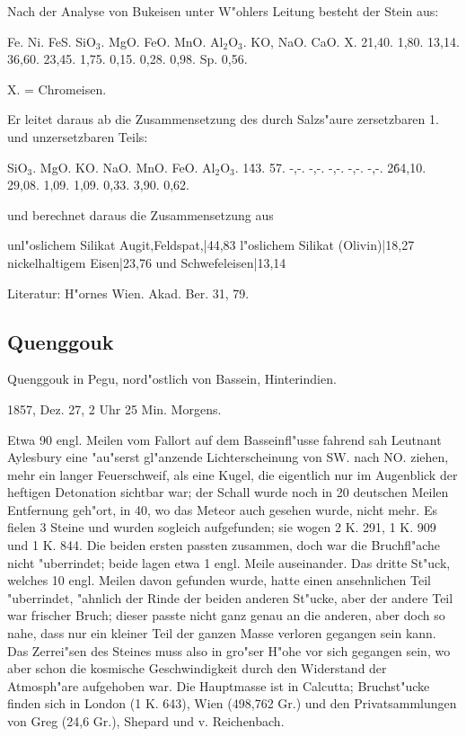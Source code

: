\documentclass[a4paper, 11pt, oneside]{article}
\begin{document}
Nach der Analyse von Bukeisen unter W"ohlers Leitung besteht der Stein aus:

Fe. Ni. FeS. SiO$_{3}$. MgO. FeO. MnO. Al$_{2}$O$_{3}$. KO, NaO. CaO. X.  
21,40. 1,80. 13,14. 36,60. 23,45. 1,75. 0,15. 0,28. 0,98. Sp. 0,56.

X. = Chromeisen.

Er leitet daraus ab die Zusammensetzung des durch Salzs"aure zersetzbaren 1. und unzersetzbaren Teils:

SiO$_{3}$. MgO. KO. NaO. MnO. FeO. Al$_{2}$O$_{3}$.  
1\. 43. 57. -,-. -,-. -,-. -,-. -,-.  
2\. 64,10. 29,08. 1,09. 1,09. 0,33. 3,90. 0,62.

und berechnet daraus die Zusammensetzung aus

unl"oslichem Silikat {Augit,Feldspat,}|44,83  
l"oslichem Silikat (Olivin)|18,27  
nickelhaltigem Eisen|23,76  
und Schwefeleisen|13,14

Literatur: H"ornes Wien. Akad. Ber. 31, 79.

\subsection{Quenggouk}

Quenggouk in Pegu, nord"ostlich von Bassein, Hinterindien.

1857, Dez. 27, 2 Uhr 25 Min. Morgens.

Etwa 90 engl. Meilen vom Fallort auf dem Basseinfl"usse fahrend sah Leutnant Aylesbury eine "au"serst gl"anzende Lichterscheinung von SW. nach NO. ziehen, mehr ein langer Feuerschweif, als eine Kugel, die eigentlich nur im Augenblick der heftigen Detonation sichtbar war; der Schall wurde noch in 20 deutschen Meilen Entfernung geh"ort, in 40, wo das Meteor auch gesehen wurde, nicht mehr. Es fielen 3 Steine und wurden sogleich aufgefunden; sie wogen 2 K. 291, 1 K. 909 und 1 K. 844. Die beiden ersten passten zusammen, doch war die Bruchfl"ache nicht "uberrindet; beide lagen etwa 1 engl. Meile auseinander. Das dritte St"uck, welches 10 engl. Meilen davon gefunden wurde, hatte einen ansehnlichen Teil "uberrindet, "ahnlich der Rinde der beiden anderen St"ucke, aber der andere Teil war frischer Bruch; dieser passte nicht ganz genau an die anderen, aber doch so nahe, dass nur ein kleiner Teil der ganzen Masse verloren gegangen sein kann. Das Zerrei"sen des Steines muss also in gro"ser H"ohe vor sich gegangen sein, wo aber schon die kosmische Geschwindigkeit durch den Widerstand der Atmosph"are aufgehoben war. Die Hauptmasse ist in Calcutta; Bruchst"ucke finden sich in London (1 K. 643), Wien (498,762 Gr.) und den Privatsammlungen von Greg (24,6 Gr.), Shepard und v. Reichenbach.
\end{document}

